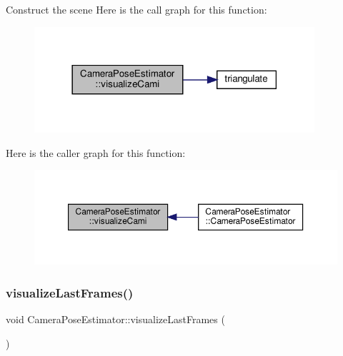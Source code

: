 Construct the scene Here is the call graph for this function\+:\nopagebreak
\begin{figure}[H]
\begin{center}
\leavevmode
\includegraphics[width=294pt]{classCameraPoseEstimator_a77d2c2226c4f11ec9e65f3552086abff_cgraph}
\end{center}
\end{figure}
Here is the caller graph for this function\+:\nopagebreak
\begin{figure}[H]
\begin{center}
\leavevmode
\includegraphics[width=350pt]{classCameraPoseEstimator_a77d2c2226c4f11ec9e65f3552086abff_icgraph}
\end{center}
\end{figure}
\mbox{\label{classCameraPoseEstimator_a8d19513e75924b7e3e56e79a97c534a5}} 
\subsubsection{\texorpdfstring{visualize\+Last\+Frames()}{visualizeLastFrames()}}
{\footnotesize\ttfamily void Camera\+Pose\+Estimator\+::visualize\+Last\+Frames (\begin{DoxyParamCaption}{ }\end{DoxyParamCaption})}

